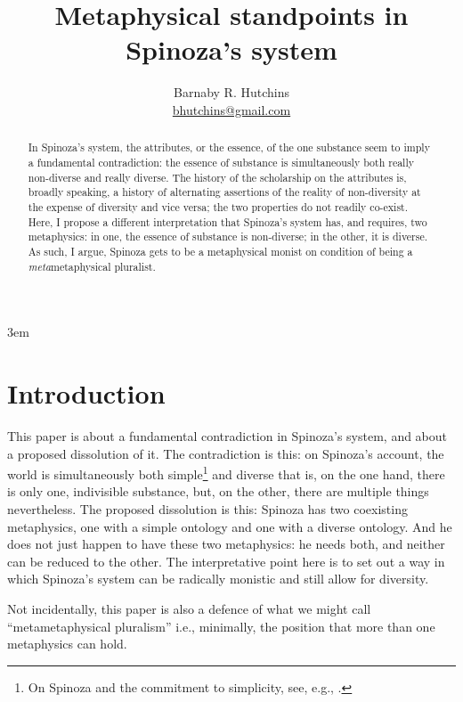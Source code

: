 \documentclass[11pt]{article}
\title{Metaphysical standpoints in Spinoza's system}
\author{Barnaby R. Hutchins \\ \small\href{mailto:bhutchins@gmail.com}{bhutchins@gmail.com}}
\date{}
\newcommand{\dash}{\unskip{---}}
\begin{document}
	\emergencystretch 3em
	
	\maketitle

	\nocite{CM}
	
	
	\begin{abstract}
		In Spinoza’s system, the attributes, or the essence, of the one substance seem to imply a fundamental contradiction: the essence of substance is simultaneously both really non-diverse and really diverse. The history of the scholarship on the attributes is, broadly speaking, a history of alternating assertions of the reality of non-diversity at the expense of diversity and vice versa; the two properties do not readily co-exist. Here, I propose a different interpretation \dash that Spinoza's system has, and requires, two metaphysics: in one, the essence of substance is non-diverse; in the other, it is diverse. As such, I argue, Spinoza gets to be a metaphysical monist on condition of being a \emph{meta}metaphysical pluralist. 
	\end{abstract}
	
	\section{Introduction} \label{sec:Intro}
	
	This paper is about a fundamental contradiction in Spinoza’s system, and about a proposed dissolution of it. The contradiction is this: on Spinoza’s account, the world is simultaneously both simple\footnote{On Spinoza and the commitment to simplicity, see, e.g., \cite[85--86]{schmidtFormalDistinction}.} and diverse \dash that is, on the one hand, there is only one, indivisible substance, but, on the other, there are multiple things nevertheless. The proposed dissolution is this: Spinoza has two coexisting metaphysics, one with a simple ontology and one with a diverse ontology. And he does not just happen to have these two metaphysics: he needs both, and neither can be reduced to the other. The interpretative point here is to set out a way in which Spinoza's system can be radically monistic and still allow for diversity.
	
	Not incidentally, this paper is also a defence of what we might call \enquote{metametaphysical pluralism} \dash i.e., minimally, the position that more than one metaphysics can hold.
	
\end{document}
